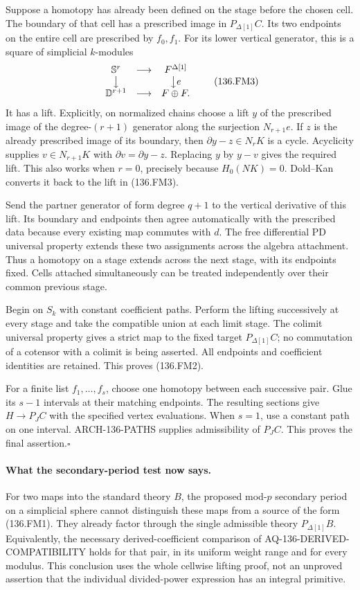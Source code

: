 Suppose a homotopy has already been defined on the stage before
the chosen cell.  The boundary of that cell has a prescribed image
in $P_{\Delta[1]}C$.  Its two endpoints on the entire cell are
prescribed by $f_0,f_1$.  For its lower vertical generator, this is
a square of simplicial $k$-modules
\[
 \begin{array}{ccc}
 \mathbb S^r&\longrightarrow&F^{\Delta[1]}\\
 \big\downarrow&&\big\downarrow e\\
 \mathbb D^{r+1}&\longrightarrow&F\oplus F.
 \end{array}                                             \tag{136.FM3}
\]
It has a lift.  Explicitly, on normalized chains choose a lift $y$
of the prescribed image of the degree-$(r+1)$ generator along the
surjection $N_{r+1}e$.  If $z$ is the already prescribed image of
its boundary, then $\partial y-z\in N_rK$ is a cycle.
Acyclicity supplies $v\in N_{r+1}K$ with
$\partial v=\partial y-z$.  Replacing $y$ by $y-v$ gives the
required lift.  This also works when $r=0$, precisely because
$H_0(NK)=0$.  Dold--Kan converts it back to the lift in (136.FM3).

Send the partner generator of form degree $q+1$ to the vertical
derivative of this lift.  Its boundary and endpoints then agree
automatically with the prescribed data because every existing
map commutes with $d$.  The free differential PD universal property
extends these two assignments across the algebra attachment.
Thus a homotopy on a stage extends across the next stage, with its
endpoints fixed.  Cells attached simultaneously can be treated
independently over their common previous stage.

Begin on $S_k$ with constant coefficient paths.  Perform the lifting
successively at every stage and take the compatible union at each
limit stage.  The colimit universal property gives a strict map
to the fixed target $P_{\Delta[1]}C$; no commutation of a cotensor
with a colimit is being asserted.  All endpoints and coefficient
identities are retained.  This proves (136.FM2).

For a finite list $f_1,\ldots,f_s$, choose one homotopy between each
successive pair.  Glue its $s-1$ intervals at their matching
endpoints.  The resulting sections give $H\to P_JC$ with the
specified vertex evaluations.  When $s=1$, use a constant path on
one interval.  ARCH-136-PATHS supplies admissibility of $P_JC$.
This proves the final assertion.\hfill$\square$

\paragraph{What the secondary-period test now says.}
For two maps into the standard theory $B$, the proposed mod-$p$
secondary period on a simplicial sphere cannot distinguish these
maps from a source of the form (136.FM1).  They already factor
through the single admissible theory $P_{\Delta[1]}B$.
Equivalently, the necessary derived-coefficient comparison of
AQ-136-DERIVED-COMPATIBILITY holds for that pair, in its uniform
weight range and for every modulus.  This conclusion uses the
whole cellwise lifting proof, not an unproved assertion that the
individual divided-power expression has an integral primitive.

